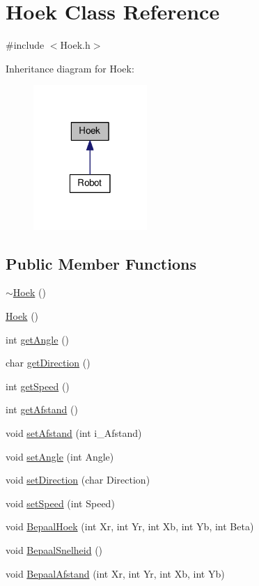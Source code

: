 \hypertarget{classHoek}{\section{Hoek Class Reference}
\label{classHoek}
}


{\ttfamily \#include $<$Hoek.\-h$>$}



Inheritance diagram for Hoek\-:
\nopagebreak
\begin{figure}[H]
\begin{center}
\leavevmode
\includegraphics[width=122pt]{classHoek__inherit__graph}
\end{center}
\end{figure}
\subsection*{Public Member Functions}
\begin{DoxyCompactItemize}
\item 
\hyperlink{classHoek_a582c81967d4d5a0211faa32a9387457b}{$\sim$\-Hoek} ()
\item 
\hyperlink{classHoek_a00f72681885213e1d92bdd6d5e690081}{Hoek} ()
\item 
int \hyperlink{classHoek_a6418dc2139cedec6df600f7102ab4d95}{get\-Angle} ()
\item 
char \hyperlink{classHoek_af74f65686c7a2e9266853fa01dd74300}{get\-Direction} ()
\item 
int \hyperlink{classHoek_adefa1a4bc29befe4c2cee9026bed171b}{get\-Speed} ()
\item 
int \hyperlink{classHoek_a828b6cc7d878e741f463edc6f9d9253b}{get\-Afstand} ()
\item 
void \hyperlink{classHoek_a35ba5e42ed8ff1b5b95d568c46c4d7b0}{set\-Afstand} (int i\-\_\-\-Afstand)
\item 
void \hyperlink{classHoek_a810d85dd19ad702298481d8d596e40ae}{set\-Angle} (int Angle)
\item 
void \hyperlink{classHoek_a30c2341705ff4b57d662a47689a567bb}{set\-Direction} (char Direction)
\item 
void \hyperlink{classHoek_a3d3f8f53b047999c6da708df5128c2c8}{set\-Speed} (int Speed)
\item 
void \hyperlink{classHoek_a51fbe1b1eba5971727450d7880ab7422}{Bepaal\-Hoek} (int Xr, int Yr, int Xb, int Yb, int Beta)
\item 
void \hyperlink{classHoek_a03065000b2764ae9ad767bb22fde68f1}{Bepaal\-Snelheid} ()
\item 
void \hyperlink{classHoek_a7dab6f40d750f5e9d0c18ad8e1b75a91}{Bepaal\-Afstand} (int Xr, int Yr, int Xb, int Yb)
\end{DoxyCompactItemize}
